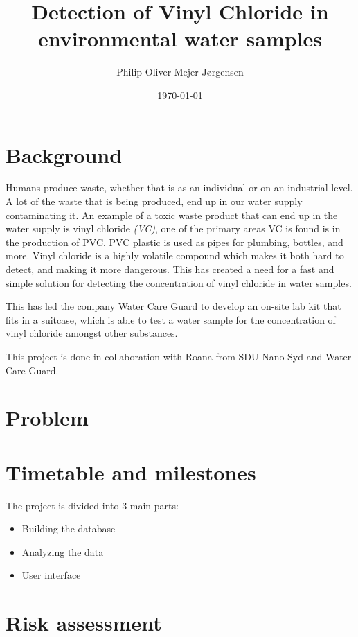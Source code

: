 \documentclass{article}
\title{Detection of Vinyl Chloride in environmental water samples}
\author{Philip Oliver Mejer Jørgensen}
\date{\today}
\begin{document}
\maketitle

\section*{Background}
Humans produce waste, whether that is as an individual or on an industrial level. A lot of the waste that is being produced, end up in our water supply contaminating it.
An example of a toxic waste product that can end up in the water supply is vinyl chloride \textit{(VC)}, one of the primary areas VC is found is in the production of PVC.
PVC plastic is used as pipes for plumbing, bottles, and more\cite{pvc_applications}.
Vinyl chloride is a highly volatile compound which makes it both hard to detect, and making it more dangerous.
This has created a need for a fast and simple solution for detecting the concentration of vinyl chloride in water samples.

This has led the company Water Care Guard to develop an on-site lab kit that fits in a suitcase, which is able to test a water sample for the concentration of vinyl chloride amongst other substances.

This project is done in collaboration with Roana from SDU Nano Syd and Water Care Guard.

\vspace{15mm}

\section*{Problem}


\vspace{15mm}
\section*{Timetable and milestones}
The project is divided into 3 main parts:\\
\begin{itemize}
    \item Building the database
    \item Analyzing the data
    \item User interface
\end{itemize}

\vspace{15mm}
\section*{Risk assessment}
\end{document}
